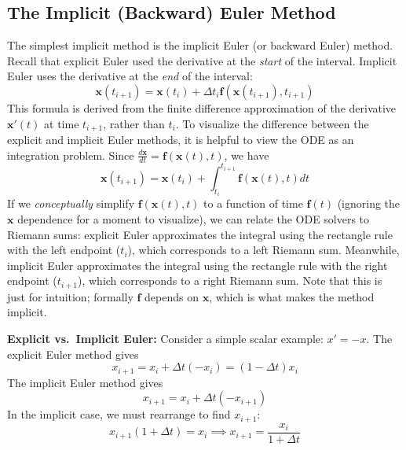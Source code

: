 \subsection{The Implicit (Backward) Euler Method}

The simplest implicit method is the implicit Euler (or backward Euler) method. Recall that explicit Euler used the derivative at the \textit{start} of the interval. Implicit Euler uses the derivative at the \textit{end} of the interval:
\begin{equation}
    \mathbf{x}(t_{i+1}) = \mathbf{x}(t_i) + \Delta t_i \mathbf{f}(\mathbf{x}(t_{i+1}), t_{i+1})
\end{equation}
This formula is derived from the finite difference approximation of the derivative $\mathbf{x}'(t)$ at time $t_{i+1}$, rather than $t_i$. To visualize the difference between the explicit and implicit Euler methods, it is helpful to view the ODE as an integration problem. Since $\frac{d\mathbf{x}}{dt} = \mathbf{f}(\mathbf{x}(t), t)$, we have
\begin{equation}
    \mathbf{x}(t_{i+1}) = \mathbf{x}(t_i) + \int_{t_i}^{t_{i+1}} \mathbf{f}(\mathbf{x}(t), t) dt
\end{equation}
If we \textit{conceptually} simplify $\mathbf{f}(\mathbf{x}(t), t)$ to a function of time $\mathbf{f}(t)$ (ignoring the $\mathbf{x}$ dependence for a moment to visualize), we can relate the ODE solvers to Riemann sums: explicit Euler approximates the integral using the rectangle rule with the left endpoint ($t_i$), which corresponds to a left Riemann sum. Meanwhile, implicit Euler approximates the integral using the rectangle rule with the right endpoint ($t_{i+1}$), which corresponds to a right Riemann sum. Note that this is just for intuition; formally $\mathbf{f}$ depends on $\mathbf{x}$, which is what makes the method implicit.

\begin{exampleBox}
    \textbf{Explicit vs.\ Implicit Euler:} Consider a simple scalar example: $x' = -x$.
    The explicit Euler method gives
    \begin{equation}
        x_{i+1} = x_i + \Delta t (-x_i) = (1-\Delta t)x_i
    \end{equation}
    The implicit Euler method gives
    \begin{equation}
        x_{i+1} = x_i + \Delta t (-x_{i+1})
    \end{equation}
    In the implicit case, we must rearrange to find $x_{i+1}$:
    \begin{equation}
        x_{i+1} (1 + \Delta t) = x_i \implies x_{i+1} = \frac{x_i}{1 + \Delta t}
    \end{equation}
\end{exampleBox}

